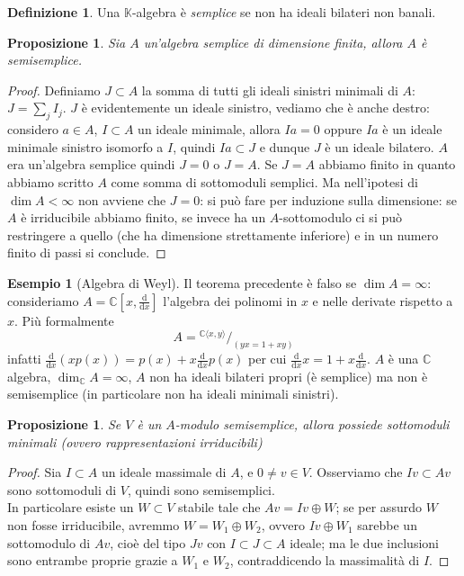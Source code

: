 \documentclass[11pt]{article}
\theoremstyle{plain}
\newtheorem{prop}[thm]{Proposizione}
\theoremstyle{definition}
\newtheorem{defn}{Definizione}[section]
\newtheorem{exmp}{Esempio}[section]
\theoremstyle{remark}
\newcommand{\C}{\mathbb{C}}
\newcommand{\K}{\mathbb{K}}
\newcommand*\quot[2]{{^{\textstyle #1}\big/_{\textstyle #2}}}
\newcommand{\dx}{\text{d}x}
\newcommand{\diff}{\text{d}}
\begin{document}
\begin{defn}
	Una $\K$-algebra è \textit{semplice} se non ha ideali bilateri non banali.
\end{defn}

\begin{prop}
	Sia $A$ un'algebra semplice di dimensione finita, allora $A$ è semisemplice.
\end{prop}
\begin{proof}
	Definiamo $J\subset A$ la somma di tutti gli ideali sinistri minimali di $A$: $J=\sum_j I_j$. $J$ è evidentemente un ideale sinistro, vediamo che è anche destro: considero $a\in A$, $I\subset A$ un ideale minimale, allora $Ia = 0$ oppure $Ia$ è un ideale minimale sinistro isomorfo a $I$, quindi $Ia\subset J$ e dunque $J$ è un ideale bilatero. $A$ era un'algebra semplice quindi $J=0$ o $J=A$. Se $J=A$ abbiamo finito in quanto abbiamo scritto $A$ come somma di sottomoduli semplici. Ma nell'ipotesi di $\dim A <\infty$ non avviene che $J=0$: si può fare per induzione sulla dimensione: se $A$ è irriducibile abbiamo finito, se invece ha un $A$-sottomodulo ci si può restringere a quello (che ha dimensione strettamente inferiore) e in un numero finito di passi si conclude.
\end{proof}

\begin{exmp}[Algebra di Weyl]
	Il teorema precedente è falso se $\dim A = \infty$: consideriamo $A=\C\left[ x,\frac{\diff}{\dx} \right]$ l'algebra dei polinomi in $x$ e nelle derivate rispetto a $x$. Più formalmente
	\[
		A=\quot{\C\langle x,y\rangle}{(yx=1+xy)}
	\]
	infatti $\frac{\diff}{\dx}(xp(x)) = p(x)+x\frac{\diff}{\dx}p(x)$ per cui $\frac{\diff}{\dx}x=1+x\frac{\diff}{\dx}$. $A$ è una $\C$ algebra, $\dim_{\C} A = \infty$, $A$ non ha ideali bilateri propri (è semplice) ma non è semisemplice (in particolare non ha ideali minimali sinistri).
\end{exmp}

\begin{prop}
 Se $V$ è un $A$-modulo semisemplice, allora possiede sottomoduli minimali (ovvero rappresentazioni irriducibili)
\end{prop}
\begin{proof}
 Sia $I\subset A$ un ideale massimale di $A$, e $0\neq v\in V$. Osserviamo che $Iv\subset Av$ sono sottomoduli di $V$, quindi sono semisemplici.\\
 In particolare esiste un $W\subset V$ stabile tale che $Av=Iv\oplus W$; se per assurdo $W$ non fosse irriducibile, avremmo $W=W_1\oplus W_2$, ovvero $Iv\oplus W_1$ sarebbe un sottomodulo di $Av$, cioè del tipo $Jv$ con $I\subset J\subset A$ ideale; ma le due inclusioni sono entrambe proprie grazie a $W_1$ e $W_2$, contraddicendo la massimalità di $I$.
\end{proof}
\end{document}
